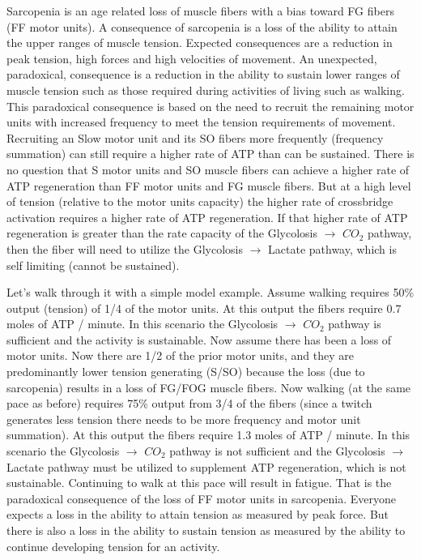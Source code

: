 Sarcopenia is an age related loss of muscle fibers with a bias toward FG fibers (FF motor units). A consequence of sarcopenia is a loss of the ability to attain the upper ranges of muscle tension. Expected consequences are a reduction in peak tension, high forces and high velocities of movement. An unexpected, paradoxical, consequence is a reduction in the ability to sustain lower ranges of muscle tension such as those required during activities of living such as walking. This paradoxical consequence is based on the need to recruit the remaining motor units with increased frequency to meet the tension requirements of movement. Recruiting an Slow motor unit and its SO fibers more frequently (frequency summation) can still require a higher rate of ATP than can be sustained. There is no question that S motor units and SO muscle fibers can achieve a higher rate of ATP regeneration than FF motor units and FG muscle fibers. But at a high level of tension (relative to the motor units capacity) the higher rate of crossbridge activation requires a higher rate of ATP regeneration. If that higher rate of ATP regeneration is greater than the rate capacity of the Glycolosis $\rightarrow$ $CO_2$ pathway, then the fiber will need to utilize the Glycolosis $\rightarrow$ Lactate pathway, which is self limiting (cannot be sustained). 

Let's walk through it with a simple model example. Assume walking requires 50\% output (tension) of 1/4 of the motor units. At this output the fibers require 0.7 moles of ATP / minute. In this scenario the Glycolosis $\rightarrow$ $CO_2$ pathway is sufficient and the activity is sustainable. Now assume there has been a loss of motor units. Now there are 1/2 of the prior motor units, and they are predominantly lower tension generating (S/SO) because the loss (due to sarcopenia) results in a loss of FG/FOG muscle fibers. Now walking (at the same pace as before) requires 75\% output from 3/4 of the fibers (since a twitch generates less tension there needs to be more frequency and motor unit summation). At this output the fibers require 1.3 moles of ATP / minute. In this scenario the Glycolosis $\rightarrow$ $CO_2$ pathway is not sufficient and the Glycolosis $\rightarrow$ Lactate pathway must be utilized to supplement ATP regeneration, which is not sustainable. Continuing to walk at this pace will result in fatigue. That is the paradoxical consequence of the loss of FF motor units in sarcopenia. Everyone expects a loss in the ability to attain tension as measured by peak force. But there is also a loss in the ability to sustain tension as measured by the ability to continue developing tension for an activity.



